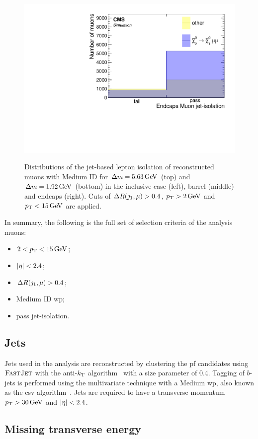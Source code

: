 \begin{figure}[!htb]
\includegraphics[width=0.32\linewidth]{plots/lepton_selection/lepton_selection_dm1p92/none_Muons_pt_endcape_jet_iso.pdf} \\
\caption[Distributions of the jet-based lepton isolation of reconstructed muons]{Distributions of the jet-based lepton isolation of reconstructed muons with Medium ID for $\Delta m=5.63\,\text{Ge\hspace{-.08em}V}$ (top) and $\Delta m=1.92\,\text{Ge\hspace{-.08em}V}$ (bottom) in the inclusive \pt case (left), barrel (middle) and endcaps (right). Cuts of $\Delta R(\jmath_1,\mu)>0.4$, $p_{\mathrm{T}}>2\,\text{Ge\hspace{-.08em}V}$ and $p_{\mathrm{T}}<15\,\text{Ge\hspace{-.08em}V}$ are applied.}
\label{fig:muons-selection-isolation}
\end{figure}

In summary, the following is the full set of selection criteria of the analysis muons:

\begin{itemize}
\item $2<p_{\mathrm{T}}<15\,\text{Ge\hspace{-.08em}V}$;
\item $\abs{\eta} < 2.4$;
\item $\Delta R(\jmath_1,\mu)>0.4$;
\item Medium ID \gls{wp};
\item pass jet-isolation.
\end{itemize}



\clearpage

\subsection{Jets}
\label{subsec:jets}

Jets used in the analysis are reconstructed by clustering the \gls{pf} candidates using ${\textsc{FastJet}}$ with the anti-$k_{\mathrm{T}}$ algorithm~\cite{Cacciari_2008_antikt} with a size parameter of 0.4. Tagging of $b$-jets is performed using the multivariate technique \DEEPCSV with a Medium \gls{wp}, also known as the \gls{csv} algorithm~\cite{BTV-16-002}. Jets are required to have a transverse momentum $p_{\mathrm{T}}>30\,\text{Ge\hspace{-.08em}V}$ and $\abs{\eta}<2.4$.

\subsection{Missing transverse energy}
\label{subsec:met}

